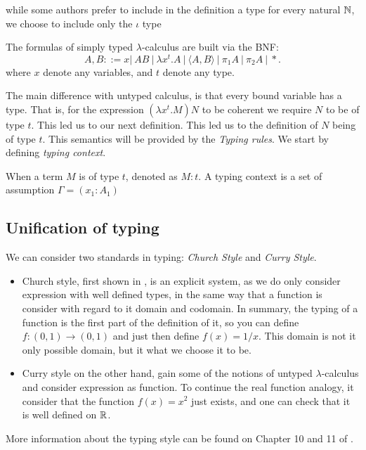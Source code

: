 while some authors prefer to include in the definition a type for every natural $\mathbb{N}$, we choose to include only the $\iota$ type 

\begin{definition}
  The formulas of simply typed $\lambda$-calculus are built via the BNF:
  $$A,B ::= x |\ AB\ |\ \lambda x^t.A \ |\ \langle A,B \rangle\ |\ \pi_1A\ |\ \pi_2A\ |\ *.$$
  where $x$ denote any variables, and $t$ denote any type. 
\end{definition}

The main difference with untyped calculus, is that every bound variable has a type. That is, for the expression $(\lambda x^t.M)N$ to be coherent we require $N$ to be of type $t$. This led us to our next definition. This led us to the definition of $N$ being of type $t$. This semantics will be provided by the \emph {Typing rules}. We start by defining \emph{typing context}.

\begin{definition}
  When a term $M$ is of type $t$, denoted as $M:t$. A typing context is a set of assumption $\Gamma = (x_1:A_1)$
\end{definition}

\subsection{Unification of typing}

We can consider two standards in typing: \emph{Church Style} and \emph{Curry Style}.
\begin{itemize}
\item Church style,  first shown in \cite{church1940formulation}, is an explicit system, as we do only consider expression with well defined types, in the same way that a function is consider with regard to it domain and codomain. In summary, the typing of a function is the first part of the definition of it, so you can define $f:(0,1)\to (0,1)$ and just then define $f(x)=1/x$. This domain is not it only possible domain, but it what we choose it to be. 
\item Curry style on the other hand, gain some of the notions of untyped $\lambda$-calculus and consider expression as function. To continue the real function analogy, it consider that the function $f(x)=x^2$ just exists, and one can check that it is well defined on $\mathbb{R}$. \\
\end{itemize}
 More information about the typing style can be found on Chapter 10 and 11 of \cite{hindley2008lambda}. 
